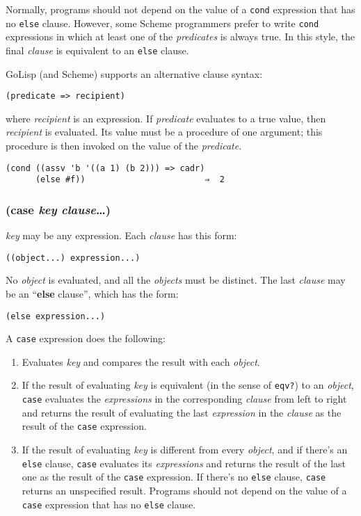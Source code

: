 \documentclass{article}
\begin{document}
Normally, programs should not depend on the value of a \verb|cond| expression that has no
\verb|else| clause. However, some Scheme programmers prefer to write \verb|cond|
expressions in which at least one of the \emph{predicates} is always true. In this style, the
final \emph{clause} is equivalent to an \verb|else| clause.

GoLisp (and Scheme) supports an alternative clause syntax:

\begin{verbatim}
(predicate => recipient)
\end{verbatim}

where \emph{recipient} is an expression. If \emph{predicate} evaluates to a true value, then
\emph{recipient} is evaluated. Its value must be a procedure of one argument; this procedure
is then invoked on the value of the \emph{predicate}.

\begin{verbatim}
(cond ((assv 'b '((a 1) (b 2))) => cadr)
      (else #f))                        ⇒  2
\end{verbatim}

\subsubsection{(case \emph{key} \emph{clause}\ldots{})}

\emph{key} may be any expression.  Each \emph{clause} has this form:

\begin{verbatim}
((object...) expression...)
\end{verbatim}

No \emph{object} is evaluated, and all the \emph{objects} must be distinct. The last
\emph{clause} may be an ``\textbf{else} clause'', which has the form:

\begin{verbatim}
(else expression...)
\end{verbatim}

A \verb|case| expression does the following:

\begin{enumerate}
\item Evaluates \emph{key} and compares the result with each \emph{object}.
\item If the result of evaluating \emph{key} is equivalent (in the sense of \verb|eqv?|) to
  an \emph{object}, \verb|case| evaluates the \emph{expressions} in the corresponding
  \emph{clause} from left to right and returns the result of evaluating the last
  \emph{expression} in the \emph{clause} as the result of the \verb|case| expression.
\item If the result of evaluating \emph{key} is different from every \emph{object}, and if
  there's an \verb|else| clause, \verb|case| evaluates its \emph{expressions} and returns
  the result of the last one as the result of the \verb|case| expression. If there's no
  \verb|else| clause, \verb|case| returns an unspecified result. Programs should not
  depend on the value of a \verb|case| expression that has no \verb|else| clause.
\end{enumerate}
\end{document}
